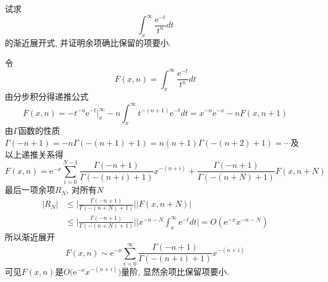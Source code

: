 \begin{problem}[习题2.2]
试求
\[
\int_x^\infty \frac{\mathrm{e}^{-t}}{t^n} dt
\]
的渐近展开式, 并证明余项确比保留的项要小.
\end{problem}

\begin{solution}
令
\[
F(x,n)=\int_{x}^{\infty}\frac{\mathrm{e}^{-t}}{t^{n}}dt
\]
由分步积分得递推公式
\[
F(x,n)=-t^{-n}\mathrm{e}^{-t}\Big|_{x}^{\infty}-n\int_{x}^{\infty}t^{-(n+1)}\mathrm{e}^{-t}dt=x^{-n}\mathrm{e}^{-x}-nF(x,n+1)
\]
由$\Gamma$函数的性质$\Gamma(-n+1)=-n\Gamma(-(n+1)+1)=n(n+1)\Gamma(-(n+2)+1)=\cdots$及以上递推关系得
\[
F(x,n)=\mathrm{e}^{-x}\sum_{i=0}^{N-1}\frac{\Gamma(-n+1)}{\Gamma(-(n+i)+1)}x^{-(n+i)}+\frac{\Gamma(-n+1)}{\Gamma(-(n+N)+1)}F(x,n+N)
\]
最后一项余项$R_{N}$, 对所有$N$
\begin{align*}
|R_{N}| & \leq\bigg|\frac{\Gamma(-n+1)}{\Gamma(-(n+N)+1)}\bigg||F(x,n+N)|\\
 & \leq\bigg|\frac{\Gamma(-n+1)}{\Gamma(-(n+N)+1)}\bigg|
 \bigg|x^{-n-N}\int_{x}^{\infty}\mathrm{e}^{-t}dt\bigg|=O(\mathrm{e}^{-x}x^{-n-N})
\end{align*}
所以渐近展开
\[
F(x,n)\sim\mathrm{e}^{-x}\sum_{i=0}^{\infty}\frac{\Gamma(-n+1)}{\Gamma(-(n+i)+1)}x^{-(n+i)}
\]
可见$F(x,n)$是$O\big(\mathrm{e}^{-x}x^{-(n+i)}\big)$量阶, 显然余项比保留项要小.
\end{solution} 

